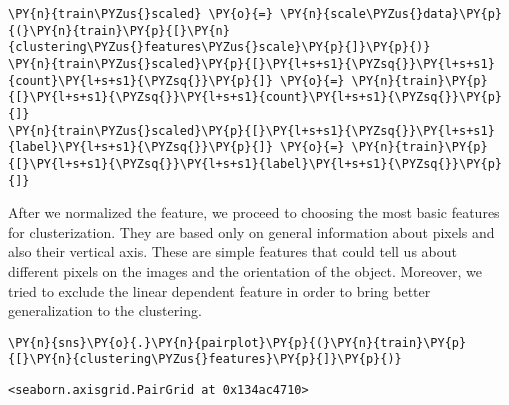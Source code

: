 \begin{tcolorbox}[breakable, size=fbox, boxrule=1pt, pad at break*=1mm,colback=cellbackground, colframe=cellborder]
\begin{Verbatim}[commandchars=\\\{\}]
\PY{n}{train\PYZus{}scaled} \PY{o}{=} \PY{n}{scale\PYZus{}data}\PY{p}{(}\PY{n}{train}\PY{p}{[}\PY{n}{clustering\PYZus{}features\PYZus{}scale}\PY{p}{]}\PY{p}{)}
\PY{n}{train\PYZus{}scaled}\PY{p}{[}\PY{l+s+s1}{\PYZsq{}}\PY{l+s+s1}{count}\PY{l+s+s1}{\PYZsq{}}\PY{p}{]} \PY{o}{=} \PY{n}{train}\PY{p}{[}\PY{l+s+s1}{\PYZsq{}}\PY{l+s+s1}{count}\PY{l+s+s1}{\PYZsq{}}\PY{p}{]}
\PY{n}{train\PYZus{}scaled}\PY{p}{[}\PY{l+s+s1}{\PYZsq{}}\PY{l+s+s1}{label}\PY{l+s+s1}{\PYZsq{}}\PY{p}{]} \PY{o}{=} \PY{n}{train}\PY{p}{[}\PY{l+s+s1}{\PYZsq{}}\PY{l+s+s1}{label}\PY{l+s+s1}{\PYZsq{}}\PY{p}{]}
\end{Verbatim}
\end{tcolorbox}

    After we normalized the feature, we proceed to choosing the most basic
features for clusterization. They are based only on general information
about pixels and also their vertical axis. These are simple features
that could tell us about different pixels on the images and the
orientation of the object. Moreover, we tried to exclude the linear
dependent feature in order to bring better generalization to the
clustering.

    \begin{tcolorbox}[breakable, size=fbox, boxrule=1pt, pad at break*=1mm,colback=cellbackground, colframe=cellborder]
\begin{Verbatim}[commandchars=\\\{\}]
\PY{n}{sns}\PY{o}{.}\PY{n}{pairplot}\PY{p}{(}\PY{n}{train}\PY{p}{[}\PY{n}{clustering\PYZus{}features}\PY{p}{]}\PY{p}{)}
\end{Verbatim}
\end{tcolorbox}

            \begin{tcolorbox}[breakable, size=fbox, boxrule=.5pt, pad at break*=1mm, opacityfill=0]
\begin{Verbatim}[commandchars=\\\{\}]
<seaborn.axisgrid.PairGrid at 0x134ac4710>
\end{Verbatim}
\end{tcolorbox}
        
    \begin{center}
    \end{center}
    { \hspace*{\fill} \\}
    
